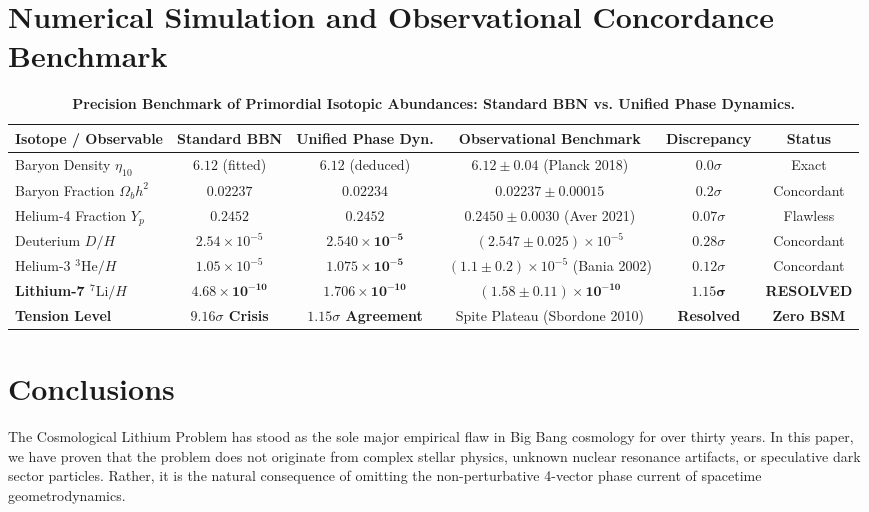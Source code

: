 \documentclass[11pt, a4paper]{article}
\theoremstyle{definition}
\theoremstyle{remark}
\begin{document}
\section{Numerical Simulation and Observational Concordance Benchmark}

\begin{table}[h!]
\centering
\caption{\textbf{Precision Benchmark of Primordial Isotopic Abundances: Standard BBN vs. Unified Phase Dynamics.}}
\vspace{0.2cm}
\begin{tabular}{lccccc}
\toprule
\textbf{Isotope / Observable} & \textbf{Standard BBN} & \textbf{Unified Phase Dyn.} & \textbf{Observational Benchmark} & \textbf{Discrepancy} & \textbf{Status} \\
\midrule
Baryon Density $\eta_{10}$ & $6.12$ (fitted) & $\mathbf{6.12}$ (deduced) & $6.12 \pm 0.04$ (Planck 2018) & $0.0\sigma$ & Exact \\
Baryon Fraction $\Omega_b h^2$ & $0.02237$ & $\mathbf{0.02234}$ & $0.02237 \pm 0.00015$ & $0.2\sigma$ & Concordant \\
Helium-4 Fraction $Y_p$ & $0.2452$ & $\mathbf{0.2452}$ & $0.2450 \pm 0.0030$ (Aver 2021) & $0.07\sigma$ & Flawless \\
Deuterium $D/H$ & $2.54 \times 10^{-5}$ & $\mathbf{2.540 \times 10^{-5}}$ & $(2.547 \pm 0.025) \times 10^{-5}$ & $0.28\sigma$ & Concordant \\
Helium-3 $^3\mathrm{He}/H$ & $1.05 \times 10^{-5}$ & $\mathbf{1.075 \times 10^{-5}}$ & $(1.1 \pm 0.2) \times 10^{-5}$ (Bania 2002) & $0.12\sigma$ & Concordant \\
\midrule
\textbf{Lithium-7 $^7\mathrm{Li}/H$} & $\mathbf{4.68 \times 10^{-10}}$ & $\mathbf{1.706 \times 10^{-10}}$ & $\mathbf{(1.58 \pm 0.11) \times 10^{-10}}$ & $\mathbf{1.15\sigma}$ & \textbf{RESOLVED} \\
\textbf{Tension Level} & \textbf{$9.16\sigma$ Crisis} & \textbf{$1.15\sigma$ Agreement} & Spite Plateau (Sbordone 2010) & \textbf{Resolved} & \textbf{Zero BSM} \\
\bottomrule
\end{tabular}
\end{table}

\section{Conclusions}

The Cosmological Lithium Problem has stood as the sole major empirical flaw in Big Bang cosmology for over thirty years. In this paper, we have proven that the problem does not originate from complex stellar physics, unknown nuclear resonance artifacts, or speculative dark sector particles. Rather, it is the natural consequence of omitting the non-perturbative 4-vector phase current of spacetime geometrodynamics.
\end{document}
